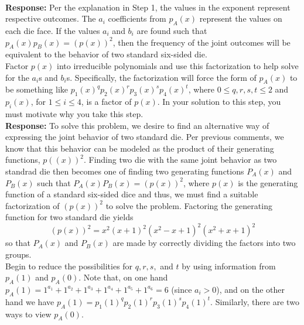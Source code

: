 \documentclass{article}
\newcommand{\response}[1]{\leavevmode\\[0.05in]{\bf Response: } #1 \leavevmode\\[0.05in]}
\begin{document}
\response{Per the explanation in Step 1, the values in the exponent represent respective outcomes.  The $a_i$ coefficients from $p_A(x)$ represent the values on each die face.  If the values $a_i$ and $b_i$ are found such that $p_A(x)p_B(x) = (p(x))^2$, then the frequency of the joint outcomes will be equivalent to the behavior of two standard six-sided die.}
  Factor $p(x)$ into irreducible polynomials and use this factorization to help solve for the $a_i$s and $b_i$s. Specifically, the factorization will force the form of $p_A(x)$ to be something like $p_1(x)^qp_2(x)^rp_3(x)^sp_4(x)^t$, where $0 \leq q,r,s,t \leq 2$ and $p_i(x)$, for $1 \leq i \leq 4$, is a factor of $p(x)$.  In your solution to this step, you must motivate why you take this step. 
\response{To solve this problem, we desire to find an alternative way of expressing the joint behavior of two standard die. Per previous comments, we know that this behavior can be modeled as the product of their generating functions, $p((x))^2$. Finding two die with the same joint behavior as two standrad die then becomes one of finding two generating functions $P_A(x)$ and $P_B(x)$ such that $P_A(x)P_B(x) = (p(x))^2$, where $p(x)$ is the generating function of a standard six-sided dice and thus, we must find a suitable factorization of $(p(x))^2$ to solve the problem. Factoring the generating function for two standard die yields
\begin{equation*}
	(p(x))^2 = x^2(x + 1)^2(x^2 - x + 1)^2(x^2 + x + 1)^2
\end{equation*} so that $P_A(x)$ and $P_B(x)$ are made by correctly dividing the factors into two groups.}
 Begin to reduce the possibilities for $q,r,s,$ and $t$ by using information from $p_A(1)$ and $p_A(0)$.  Note that, on one hand $p_A(1) = 1^{a_1} + 1^{a_2} + 1^{a_3} + 1^{a_4} + 1^{a_5}+1^{a_6} = 6$ (since $a_i > 0$), and on the other hand we have $p_A(1) = p_1(1)^qp_2(1)^rp_3(1)^sp_4(1)^t$.  Similarly, there are two ways to view $p_A(0)$.
\end{document}
